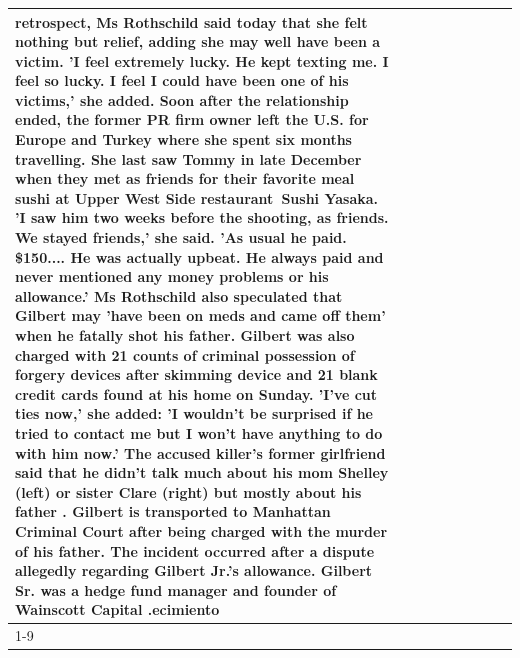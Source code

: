 \begin{table}[H]
\begin{tabular}{lllrlllll}
retrospect, Ms Rothschild said today that she felt nothing but relief, adding she may well have been a victim. 'I feel extremely lucky. He kept texting me. I feel so lucky. I feel I could have been one of his victims,' she added. Soon after the relationship ended, the former PR firm owner left the U.S. for Europe and Turkey where she spent six months  travelling. She last saw Tommy in late December when they met as friends for their favorite meal sushi at Upper West Side restaurant Sushi Yasaka. 'I saw him two weeks before the shooting, as friends. We stayed friends,' she said. 'As usual he paid. \$150.... He was actually upbeat. He always paid and never mentioned any money problems or his allowance.' Ms Rothschild also speculated that Gilbert may 'have been on meds and came off them' when he fatally shot his father. Gilbert was also charged with 21 counts of criminal possession of forgery devices after skimming device and 21 blank credit cards found at his home on Sunday. 'I've cut ties now,' she added: 'I wouldn’t be surprised if he tried to contact me but I won’t have anything to do with him now.' The accused killer's former girlfriend said that he didn't talk much about his mom Shelley (left) or sister Clare (right) but mostly about his father . Gilbert is transported to Manhattan Criminal Court  after being charged with the murder of his father. The incident occurred after a dispute allegedly regarding Gilbert Jr.'s allowance. Gilbert Sr. was a hedge fund manager and founder of Wainscott Capital .ecimiento \\
\cline{1-9}

\end{tabular}
\end{table}
